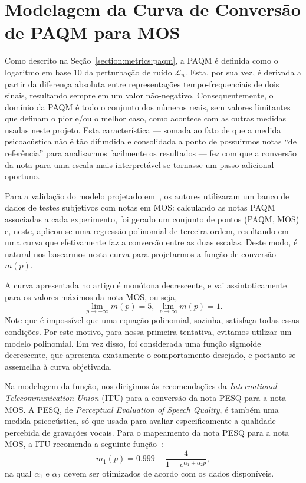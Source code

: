 \chapter{Modelagem da Curva de Conversão de PAQM para MOS}
\label{appendix:paqmtomos}

Como descrito na Seção~\ref{section:metrics:paqm}, a PAQM é definida como o logaritmo
em base 10 da perturbação de ruído $\mathcal{L}_n$. Esta, por sua vez, é derivada a
partir da diferença absoluta entre representações tempo-frequenciais de dois sinais,
resultando sempre em um valor não-negativo. Consequentemente, o domínio da PAQM é todo
o conjunto dos números reais, sem valores limitantes que definam o pior e/ou o melhor
caso, como acontece com as outras medidas usadas neste projeto. Esta característica ---
somada ao fato de que a medida psicoacústica não é tão difundida e consolidada a ponto
de possuirmos notas ``de referência'' para analisarmos facilmente os resultados --- fez
com que a conversão da nota para uma escala mais interpretável se tornasse um passo
adicional oportuno.

Para a validação do modelo projetado em~\cite{beerends-2002}, os autores utilizaram um
banco de dados de testes subjetivos com notas em MOS: calculando as notas PAQM
associadas a cada experimento, foi gerado um conjunto de pontos (PAQM, MOS) e, neste,
aplicou-se uma regressão polinomial de terceira ordem, resultando em uma curva que
efetivamente faz a conversão entre as duas escalas. Deste modo, é natural nos basearmos
nesta curva para projetarmos a função de conversão $m(p)$.

A curva apresentada no artigo é monótona decrescente, e vai assintoticamente para os
valores máximos da nota MOS, ou seja,
\begin{equation}
	\lim_{p \to -\infty} m(p) = 5,\ \lim_{p \to \infty} m(p) = 1.
\end{equation}
Note que é impossível que uma equação polinomial, sozinha, satisfaça todas essas condições. Por este motivo, para nossa primeira tentativa, evitamos utilizar um modelo polinomial. Em vez disso, foi considerada uma função sigmoide decrescente, que apresenta exatamente o comportamento desejado, e portanto se assemelha à curva objetivada.

Na modelagem da função, nos dirigimos às recomendações da \textit{International
	Telecommunication Union} (ITU) para a conversão da nota PESQ para a nota MOS. A PESQ, de \textit{Perceptual
	Evaluation of Speech Quality}, é também uma medida psicocústica, só que usada para avaliar especificamente
a qualidade percebida de gravações vocais. Para o mapeamento da nota PESQ para a nota
MOS, a ITU recomenda a seguinte função~\cite{biscainho-2015}:
\begin{equation}
	m_1(p) = 0.999 + \frac{4}{1 + e^{\alpha_1 + \alpha_2 p}},
	\label{eq:paqmtomos:sigmoid2}
\end{equation}
na qual $\alpha_1$ e $\alpha_2$ devem ser otimizados de acordo com os dados disponíveis.

